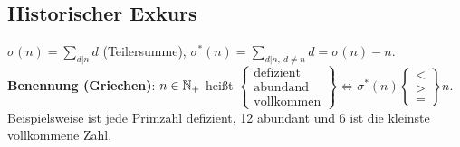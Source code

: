 \documentclass[a4paper,DIV15,BCOR12mm]{article}
\begin{document}
\subsection*{Historischer Exkurs}
$\sigma(n)=\sum_{d|n} d$ (Teilersumme), $\sigma^*(n)=\sum_{d|n,\
d\neq n} d=\sigma(n)-n$.\\
\textbf{Benennung (Griechen)}: $n\in \mathbb{N}_+$ heißt
$\left\{\begin{matrix}\text{defizient}\\\text{abundand}\\\text{vollkommen}
\end{matrix}\right\}\iff \sigma^* (n) \left\{\begin{matrix}
<\\>\\=\end{matrix}\right\}n$.\\
Beispielsweise ist jede Primzahl defizient, 12 abundant und 6 ist die kleinste vollkommene Zahl.
\end{document}
